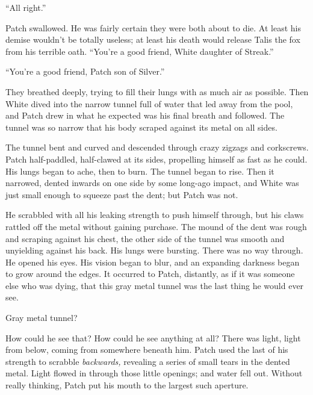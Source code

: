 \documentclass[ebook,oneside,openany,17pt]{memoir}
\newenvironment{tolerant}[1]{%
  \par\tolerance=#1\relax
}{%
  \par
}
\begin{document}
“All right.”

Patch swallowed. He was fairly certain they were both about to die. At
least his demise wouldn’t be totally useless; at least his death would
release Talis the fox from his terrible oath. “You’re a good friend,
White daughter of Streak.”

“You’re a good friend, Patch son of Silver.”

They breathed deeply, trying to fill their lungs with as much air as
possible. Then White dived into the narrow tunnel full of water that
led away from the pool, and Patch drew in what he expected was his
final breath and followed. The tunnel was so narrow that his body
scraped against its metal on all sides.

\begin{tolerant}{5000}
The tunnel bent and curved and descended through crazy zigzags and
corkscrews. Patch half-paddled, half-clawed at its sides, propelling
himself as fast as he could. His lungs began to ache, then to
burn. The tunnel began to rise. Then it narrowed, dented inwards on
one side by some long-ago impact, and White was just small enough to
squeeze past the dent; but Patch was not.
\end{tolerant}

\begin{tolerant}{1000}
He scrabbled with all his leaking strength to push himself through,
but his claws rattled off the metal without gaining purchase. The
mound of the dent was rough and scraping against his chest, the other
side of the tunnel was smooth and unyielding against his back. His
lungs were bursting. There was no way through. He opened his eyes. His
vision began to blur, and an expanding darkness began to grow around
the edges. It occurred to Patch, distantly, as if it was someone else
who was dying, that this gray metal tunnel was the last thing he would
ever see.
\end{tolerant}

Gray metal tunnel?

\begin{tolerant}{1000}
How could he see that? How could he see anything at all? There was
light, light from below, coming from somewhere beneath him. Patch used
the last of his strength to scrabble \emph{backwards,} revealing a
series of small tears in the dented metal. Light flowed in through
those little openings; and water fell out. Without really thinking,
Patch put his mouth to the largest such aperture.
\end{tolerant}
\end{document}
